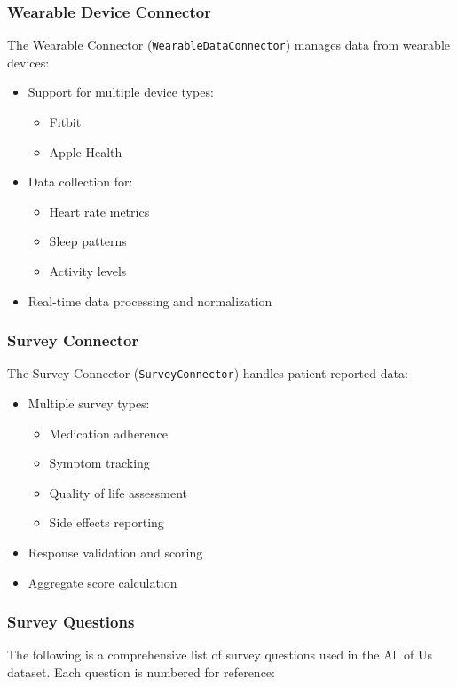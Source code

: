 \documentclass[12pt]{article}
\begin{document}
\subsubsection{Wearable Device Connector}
The Wearable Connector (\texttt{WearableDataConnector}) manages data from wearable devices:
\begin{itemize}
    \item Support for multiple device types:
    \begin{itemize}
        \item Fitbit
        \item Apple Health
    \end{itemize}
    \item Data collection for:
    \begin{itemize}
        \item Heart rate metrics
        \item Sleep patterns
        \item Activity levels
    \end{itemize}
    \item Real-time data processing and normalization
\end{itemize}

\subsubsection{Survey Connector}
The Survey Connector (\texttt{SurveyConnector}) handles patient-reported data:
\begin{itemize}
    \item Multiple survey types:
    \begin{itemize}
        \item Medication adherence
        \item Symptom tracking
        \item Quality of life assessment
        \item Side effects reporting
    \end{itemize}
    \item Response validation and scoring
    \item Aggregate score calculation
\end{itemize}

\subsubsection{Survey Questions}
The following is a comprehensive list of survey questions used in the All of Us dataset. Each question is numbered for reference:
\end{document}
